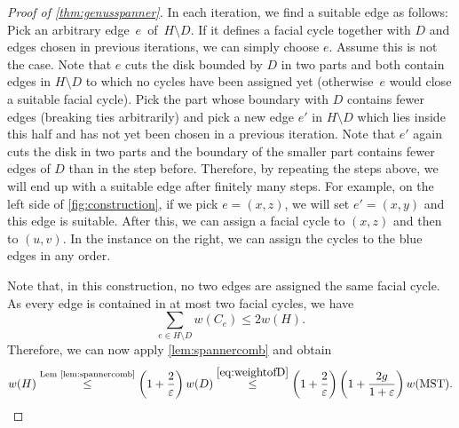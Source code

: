 \documentclass[a4paper,cleveref, autoref, thm-restate, thm-restate, UKenglish]{lipics-v2021}
\newcommand{\mst}{\mathrm{MST}}
\renewcommand{\epsilon}{\varepsilon}
\begin{document}
\begin{proof}[Proof of \cref{thm:genusspanner}]
In each iteration, we find a suitable edge as follows: Pick an arbitrary \hbox{edge $e$ of $H\setminus D$}. 
If it defines a facial cycle together with $D$ and edges chosen in previous iterations, we can simply choose $e$. 
Assume this is not the case. Note that $e$ cuts the disk bounded by $D$ in two parts and both contain edges in $H \setminus D$ to which no cycles have been assigned yet (otherwise~$e$ would close a suitable facial cycle). 
Pick the part whose boundary with $D$ contains fewer edges (breaking ties arbitrarily) and pick a new edge $e'$ in $H \setminus D$ which lies inside this half and has not yet been chosen in a previous iteration. Note that $e'$ again cuts the disk in two parts and the boundary of the smaller part contains fewer edges of $D$ than in the step before.  Therefore, by repeating the steps above, we will end up with a suitable edge after finitely many steps.  For example, on the left side of \cref{fig:construction}, if we pick $e=(x,z)$, we will set $e'=(x,y)$ and this edge is suitable. After this, we can assign a facial cycle to $(x,z)$ and then to $(u,v)$. In the instance on the right, we can assign the cycles to the blue edges in any order.


Note that, in this construction, no two edges are assigned the same facial cycle.
 As every edge is contained in at most two facial cycles, we have
\begin{equation}\label{eq:facecycles}
\sum\limits_{e \in H \setminus D} w(C_e) \leq 2 w(H).
\end{equation}
Therefore, we can now apply \cref{lem:spannercomb} and obtain
\begin{equation*}
w(H) \overset{\text{Lem \ref{lem:spannercomb}}}{\leq} \left(1+\frac{2}{\epsilon} \right) w(D)
\overset{\eqref{eq:weightofD}}{\leq} \left(1+\frac{2}{\epsilon} \right) \left(1+\frac{2g}{1+\epsilon} \right) w(\mst). \qedhere
\end{equation*}

\end{proof}
\end{document}
